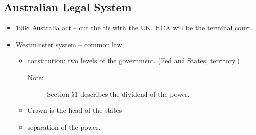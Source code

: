 \subsection*{Australian Legal System}
\begin{itemize}
    \item 1968 Australia act -- cut the tie with the UK. HCA will be the terminal court. 
    \item Westminster system -- common law
        \begin{itemize}
            \item constitution:  two levels of the government. (Fed and States, territory.)
                \begin{description}
                    \item[Note:] Section 51 describes the dividend of the power. 
                \end{description}
            \item Crown is the head of the states
            \item separation of the power. 
        \end{itemize}
    
   
\end{itemize}


